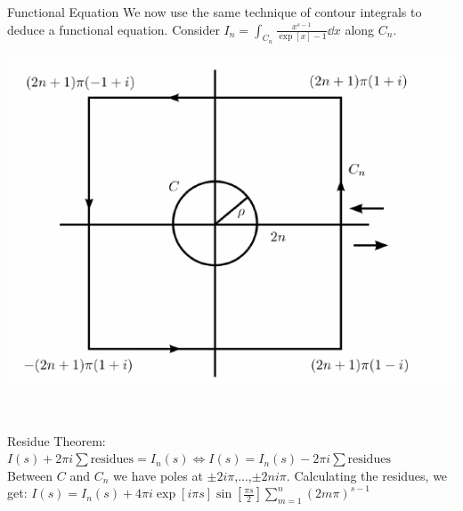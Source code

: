\documentclass[10pt, dvipsnames]{beamer}
\begin{document}
	\begin{frame}{Functional Equation}
		We now use the same technique of contour integrals to deduce a functional equation. Consider $I_n=\int_{C_n}\frac{x^{s-1}}{\exp[x]-1} \dd{x}$ along $C_n$. \\[0.2cm]
		\begin{center}
		\begin{minipage}{0.5\textwidth}
			\includegraphics[scale=0.5]{int2}
		\end{minipage}\\[0.2cm]
		\end{center}
		Residue Theorem: $I(s)+2\pi i \sum \text{residues}=I_n(s)\iff I(s)=I_n(s)-2\pi i \sum \text{residues}$ \\
		Between $C$ and $C_n$ we have poles at $\pm 2i \pi$,...,$\pm 2n i \pi$. Calculating the residues, we get: $I(s)=I_n(s)+4\pi i \exp[i \pi s]\sin\left[\frac{\pi s}{2}\right]\sum_{m=1}^{n}(2m\pi)^{s-1}$
	\end{frame}
\end{document}
